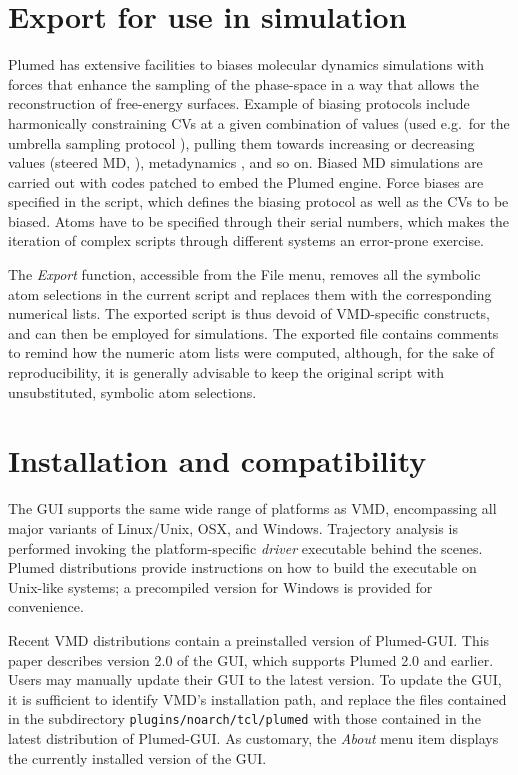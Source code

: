 \documentclass[preprint,review,11pt]{elsarticle}
\begin{document}
\section{Export for use in simulation}\label{sec:export-use-simul}

Plumed has extensive facilities to biases molecular dynamics
simulations with forces that enhance the sampling of the phase-space
in a way that allows the reconstruction of free-energy
surfaces. Example of biasing protocols include harmonically
constraining CVs at a given combination of values (used e.g.\ for the
umbrella sampling protocol \cite{Torrie_Valleau_1977}), pulling them
towards increasing or decreasing values (steered MD,
\cite{Isralewitz_Gao_Schulten_2001,Giorgino_2011}), metadynamics
\cite{Laio_Parrinello_2002}, and so on. Biased MD simulations are
carried out with codes patched to embed the Plumed engine. Force
biases are specified in the script, which defines the biasing protocol
as well as the CVs to be biased.  Atoms have to be specified
through their serial numbers, which makes the iteration of complex
scripts through different systems an error-prone exercise.

The \emph{Export} function, accessible from the File menu, removes all
the symbolic atom selections in the current script and replaces them
with the corresponding numerical lists. The exported script is thus
devoid of VMD-specific constructs, and can then be employed for
simulations.  The exported file contains comments to remind how the
numeric atom lists were computed, although, for the sake of
reproducibility, it is generally advisable to keep the original
script with unsubstituted, symbolic atom selections.



\section{Installation and compatibility}

The GUI supports the same wide range of platforms as VMD, encompassing
all major variants of Linux/Unix, OSX, and Windows.  Trajectory
analysis is performed invoking the platform-specific \emph{driver}
executable behind the scenes. Plumed distributions provide
instructions on how to build the executable on Unix-like systems; a
precompiled version for Windows is provided for convenience.

Recent VMD distributions contain a preinstalled version of Plumed-GUI.
This paper describes version 2.0 of the GUI, which supports Plumed 2.0
and earlier.  Users may manually update their GUI to the latest
version.  To update the GUI, it is sufficient to identify VMD's
installation path, and replace the files contained in the subdirectory
\texttt{plugins/noarch/tcl/plumed} with those contained in the latest
distribution of Plumed-GUI.  As customary, the \emph{About} menu item
displays the currently installed version of the GUI.
\end{document}
